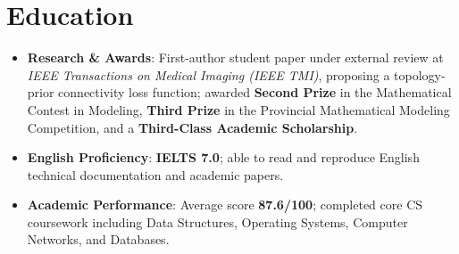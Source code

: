 \documentclass{resume}
\begin{document}

\noindent
{}

\vspace{-0.8em}

\section{Education}
\begin{itemize}[parsep=0.5ex]
    \item \textbf{Research \& Awards}: First-author student paper under external review at \textit{IEEE Transactions on Medical Imaging (IEEE TMI)}, proposing a topology-prior connectivity loss function; awarded \textbf{Second Prize} in the Mathematical Contest in Modeling, \textbf{Third Prize} in the Provincial Mathematical Modeling Competition, and a \textbf{Third-Class Academic Scholarship}.
    \item \textbf{English Proficiency}: \textbf{IELTS 7.0}; able to read and reproduce English technical documentation and academic papers.
    \item \textbf{Academic Performance}: Average score \textbf{87.6/100}; completed core CS coursework including Data Structures, Operating Systems, Computer Networks, and Databases.
\end{itemize}
\end{document}
